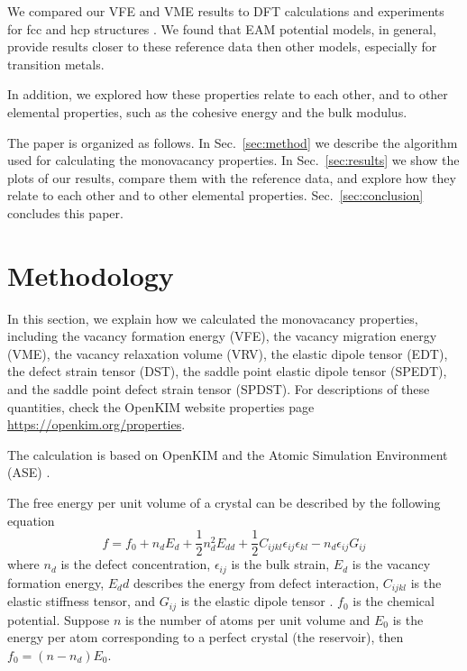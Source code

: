 \documentclass[%
 reprint,
 amsmath,amssymb,
 aps,
]{revtex4-1}
\begin{document}
We compared our VFE and VME results to DFT calculations and experiments for fcc and hcp structures \cite{angsten2014elemental}.
We found that EAM potential models, in general, provide results closer to these reference data then other models, especially for transition metals.

In addition, we explored how these properties relate to each other, and to other elemental properties, such as the cohesive energy and the bulk modulus.

The paper is organized as follows.
In Sec.~\ref{sec:method} we describe the algorithm used for calculating the monovacancy properties.
In Sec.~\ref{sec:results} we show the plots of our results, compare them with the reference data, and explore how they relate to each other and to other elemental properties.
Sec.~\ref{sec:conclusion} concludes this paper.

\section{\label{sec:method}Methodology}

In this section, we explain how we calculated the monovacancy properties, including the vacancy formation energy (VFE), the vacancy migration energy (VME), the vacancy relaxation volume (VRV), the elastic dipole tensor (EDT), the defect strain tensor (DST), the saddle point elastic dipole tensor (SPEDT), and the saddle point defect strain tensor (SPDST).
For descriptions of these quantities, check the OpenKIM website properties page \url{https://openkim.org/properties}.

The calculation is based on OpenKIM and the Atomic Simulation Environment (ASE) \cite{bahn2002object}.

The free energy per unit volume of a crystal can be described by the following equation
\begin{equation}\label{eq:f}
f = f_0 + n_dE_d + \frac{1}{2}n_d^2E_{dd} + \frac{1}{2}C_{ijkl}\epsilon_{ij}\epsilon_{kl} - n_d\epsilon_{ij}G_{ij}
\end{equation}
where $n_d$ is the defect concentration, $\epsilon_{ij}$ is the bulk strain, $E_d$ is the vacancy formation energy, $E_dd$ describes the energy from defect interaction, $C_{ijkl}$ is the elastic stiffness tensor, and $G_{ij}$ is the elastic dipole tensor \cite{freedman2009elastic}.
$f_0$ is the chemical potential.
Suppose $n$ is the number of atoms per unit volume and $E_0$ is the energy per atom corresponding to a perfect crystal (the reservoir), then $f_0 = (n - n_d) E_{0}$.
\end{document}
